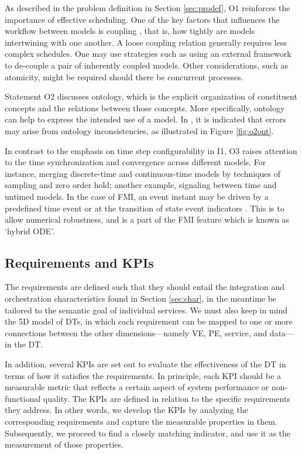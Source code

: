 \documentclass[journal,onecolumn]{IEEEtran} %
\begin{document}
As described in the problem definition in Section \ref{sec:prodef}, O1 reinforces the importance of effective scheduling. One of the key factors that influences the workflow between models is coupling \cite{Karolius2018}, that is, how tightly are models intertwining with one another. A loose coupling relation generally requires less complex schedules. One may use strategies such as using an external framework to de-couple a pair of inherently coupled models. Other considerations, such as atomicity, might be required should there be concurrent processes.

Statement O2 discusses ontology, which is the explicit organization of constituent concepts and the relations between those concepts. More specifically, ontology can help to express the intended use of a model. In \cite{Ptolemaeus2014}, it is indicated that errors may arise from ontology inconsistencies, as illustrated in Figure \ref{fig:o2ont}.

In contrast to the emphasis on time step configurability in I1, O3 raises attention to the time synchronization and convergence across different models. For instance, merging discrete-time and continuous-time models by techniques of sampling and zero order hold; another example, signaling between time and untimed models. In the case of FMI, an event instant may be driven by a predefined time event or at the transition of state event indicators \cite{Blochwitz2011}. This is to allow numerical robustness, and is a part of the FMI feature which is known as `hybrid ODE'.

\subsection{Requirements and KPIs}\label{sec:reqkpis}
The requirements are defined such that they should entail the integration and orchestration characteristics found in Section \ref{sec:char}, in the meantime be tailored to the semantic goal of individual services. We must also keep in mind the 5D model of DTs, in which each requirement can be mapped to one or more connections between the other dimensions---namely VE, PE, service, and data---in the DT. 

In addition, several KPIs are set out to evaluate the effectiveness of the DT in terms of how it satisfies the requirements. In principle, each KPI should be a measurable metric that reflects a certain aspect of system performance or non-functional quality. The KPIs are defined in relation to the specific requirements they address. In other words, we develop the KPIs by analyzing the corresponding requirements and capture the measurable properties in them. Subsequently, we proceed to find a closely matching indicator, and use it as the measurement of those properties.   
\end{document}
